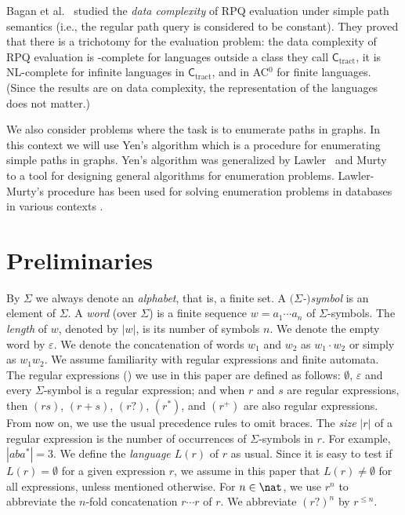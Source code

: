 \documentclass[a4paper,english]{lipics-v2016}
\newcommand{\ctract}{\ensuremath{\textsf{C}_\text{tract}}\xspace}
\theoremstyle{plain}
\begin{document}
Bagan et al.~\cite{bagan} studied the \emph{data complexity} of RPQ
evaluation under simple path semantics (i.e., the regular path query
is considered to be constant). They proved that there is a trichotomy
for the evaluation problem: the data complexity of RPQ evaluation 
 is
\np-complete for languages outside a class they call \ctract,
it is NL-complete for infinite
languages in \ctract, and in AC$^0$ for finite
languages. (Since the results are on data complexity, the
representation of the languages does not matter.)



We also consider problems where the task is to enumerate paths in
graphs.
  In this
context we will use Yen's algorithm \cite{yen} which is a procedure
for enumerating simple paths in graphs. Yen's algorithm was
generalized by Lawler~\cite{lawler} and Murty~\cite{murty} to a tool
for designing general algorithms for enumeration
problems. Lawler-Murty's procedure has been used for solving
enumeration problems in databases in various contexts
\cite{golenberg2011,KalinskyEK-edbt17,KimelfeldS-icdt13}.



      





 
\makeatletter{}\section{Preliminaries}\label{sec:preliminaries}\label{sec:definitions}

By $\Sigma$ we always denote an \emph{alphabet}, that is, a finite
set. A \emph{$(\Sigma$-$)$symbol} is an element of $\Sigma$. A
\emph{word} (over $\Sigma$) is a finite sequence $w = a_1\cdots a_n$
of $\Sigma$-symbols. The \emph{length} of $w$, denoted by $|w|$, is
its number of symbols $n$. We denote the empty word by $\varepsilon$.
We denote the concatenation of words $w_1$ and $w_2$ as $w_1 \cdot
w_2$ or simply as $w_1w_2$. 
We assume familiarity with regular expressions and finite
automata. The regular expressions (\re) we use in this paper are
defined as follows: $\emptyset$, $\varepsilon$ and every $\Sigma$-symbol is a
regular expression; and when $r$ and $s$ are regular expressions, then
$(rs)$, $(r + s)$, $(r?)$, $(r^*)$, and $(r^+)$ are also regular
expressions. From now on, we use the usual precedence rules to omit
braces.  The \emph{size} $|r|$ of a regular expression is the number
of occurrences of $\Sigma$-symbols in $r$. For example, $|aba^*| =
3$. We define the \emph{language $L(r)$} of $r$ as usual. Since it is
easy to test if $L(r) = \emptyset$ for a given expression $r$, we
assume in this paper that $L(r) \neq \emptyset$ for all expressions,
unless mentioned otherwise.
For $n \in
\nat$, we use $r^n$ 
to abbreviate the $n$-fold concatenation $r\cdots r$ of $r$. We
abbreviate $(r?)^n$ by $r^{\leq n}$.
\end{document}
